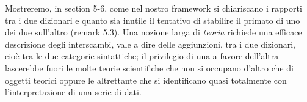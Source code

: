 Mostreremo, in section 5-6, come nel nostro framework si chiariscano i rapporti tra i due dizionari e quanto sia inutile il tentativo di stabilire il primato di uno dei due sull'altro (remark 5.3). Una nozione larga di \emph{teoria} richiede una efficace descrizione degli interscambi, vale a dire delle aggiunzioni, tra i due dizionari, cioè tra le due categorie sintattiche; il privilegio di una a favore dell'altra lascerebbe fuori le molte teorie scientifiche che non si occupano d'altro che di oggetti teorici oppure le altrettante che si identificano quasi totalmente con l'interpretazione di una serie di dati. 